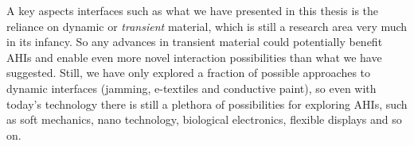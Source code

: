 A key aspects interfaces such as what we have presented in this thesis is the reliance on dynamic or \emph{transient} material, which is still a research area very much in its infancy.
So any advances in transient material could potentially benefit AHIs and enable even more novel interaction possibilities than what we have suggested.
Still, we have only explored a fraction of possible approaches to dynamic interfaces (jamming, e-textiles and conductive paint), so even with today's technology there is still a plethora of possibilities for exploring AHIs, such as soft mechanics, nano technology, biological electronics, flexible displays and so on.



